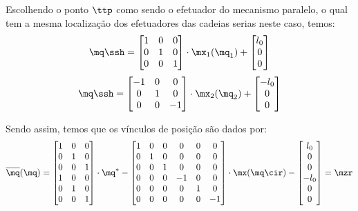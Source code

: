 \documentclass[]{politex}
\begin{document}
Escolhendo o ponto $\ttp$ como sendo o efetuador do mecanismo paralelo, o qual tem a mesma localização dos efetuadores das cadeias serias neste caso, temos:
\begin{equation}
\mq\ssh = 
\begin{bmatrix}
1 & 0 & 0 \\
0 & 1 & 0 \\
0 & 0 & 1 \\
\end{bmatrix}
\cdot
\mx_1(\mq_1)
+
\begin{bmatrix}
l_0 \\
0 \\
0 \\
\end{bmatrix}
\end{equation}
\begin{equation}
\mq\ssh = 
\begin{bmatrix}
-1 & 0 & 0 \\
0 & 1 & 0 \\
0 & 0 & -1 \\
\end{bmatrix}
\cdot
\mx_2(\mq_2)
+
\begin{bmatrix}
-l_0 \\
0 \\
0 \\
\end{bmatrix}
\end{equation}

Sendo assim, temos que os vínculos de posição são dados por:
\begin{equation}
\overline{\mq}(\mq) =
\begin{bmatrix}
1 & 0 & 0 \\
0 & 1 & 0 \\
0 & 0 & 1 \\
1 & 0 & 0 \\
0 & 1 & 0 \\
0 & 0 & 1 \\
\end{bmatrix}
\cdot
\mq^*
-
\begin{bmatrix}
1 & 0 & 0 & 0 & 0 & 0 \\
0 & 1 & 0 & 0 & 0 & 0 \\
0 & 0 & 1 & 0 & 0 & 0 \\
0 & 0 & 0 & -1 & 0 & 0 \\
0 & 0 & 0 & 0 & 1 & 0 \\
0 & 0 & 0 & 0 & 0 & -1 \\
\end{bmatrix}
\cdot
\mx(\mq\cir)
-
\begin{bmatrix}
l_0 \\
0 \\
0 \\
-l_0 \\
0 \\
0 \\
\end{bmatrix}
= \mzr
\end{equation}
\end{document}
